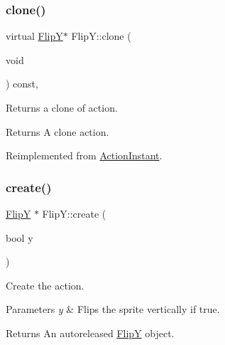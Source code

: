 \mbox{\label{classFlipY_afdd6cd24fb2238c5a13acc373c7ed6f7}} 
\subsubsection{\texorpdfstring{clone()}{clone()}\hspace{0.1cm}{\footnotesize\ttfamily [2/2]}}
{\footnotesize\ttfamily virtual \hyperlink{classFlipY}{FlipY}$\ast$ Flip\+Y\+::clone (\begin{DoxyParamCaption}\item[{void}]{ }\end{DoxyParamCaption}) const\hspace{0.3cm}{\ttfamily [override]}, {\ttfamily [virtual]}}

Returns a clone of action.

\begin{DoxyReturn}{Returns}
A clone action. 
\end{DoxyReturn}


Reimplemented from \hyperlink{classActionInstant_adb76fc6f006098109e8256210cbd8cc0}{Action\+Instant}.

\mbox{\label{classFlipY_a663bf94167b8e4a0ffc9466f8995d889}} 
\subsubsection{\texorpdfstring{create()}{create()}\hspace{0.1cm}{\footnotesize\ttfamily [1/2]}}
{\footnotesize\ttfamily \hyperlink{classFlipY}{FlipY} $\ast$ Flip\+Y\+::create (\begin{DoxyParamCaption}\item[{bool}]{y }\end{DoxyParamCaption})\hspace{0.3cm}{\ttfamily [static]}}

Create the action.


\begin{DoxyParams}{Parameters}
{\em y} & Flips the sprite vertically if true. \\
\hline
\end{DoxyParams}
\begin{DoxyReturn}{Returns}
An autoreleased \hyperlink{classFlipY}{FlipY} object. 
\end{DoxyReturn}
\mbox{\label{classFlipY_ae509cb6ad532fe6a1839bb4d696f3a2f}} 
